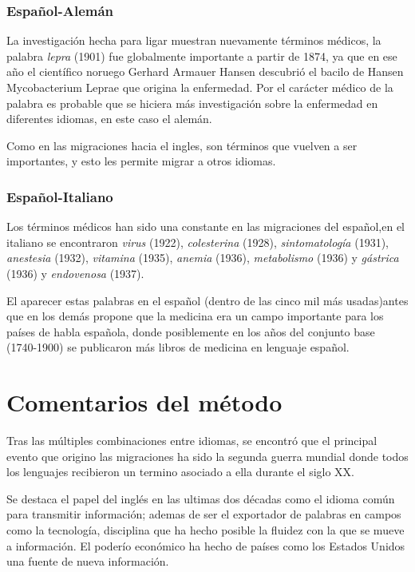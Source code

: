 \subsubsection*{Español-Alemán}


La investigación hecha para ligar muestran nuevamente términos médicos, la palabra \textit{lepra} (1901) fue globalmente importante a partir de 1874,  ya que en ese año el científico noruego Gerhard Armauer Hansen descubrió el bacilo de Hansen Mycobacterium Leprae \cite{lepra} que origina la enfermedad. Por el carácter médico de la palabra es probable que se hiciera más investigación sobre la enfermedad en diferentes idiomas, en este caso el alemán.

Como en las migraciones hacia el ingles, son términos que vuelven a ser importantes,  y esto les permite migrar a otros idiomas. 


\subsubsection*{Español-Italiano}

Los términos médicos han sido una constante en las migraciones del español,en el italiano se encontraron \textit{virus} (1922), \textit{colesterina} (1928),  \textit{sintomatología} (1931), \textit{anestesia} (1932), \textit{vitamina} (1935), \textit{anemia} (1936), \textit{metabolismo} (1936) y \textit{gástrica} (1936)  y \textit{endovenosa} (1937).  

El aparecer estas palabras en el español (dentro de las cinco mil más usadas)antes que en los demás propone que la medicina era un campo importante para los países de habla española, donde posiblemente en los años del conjunto base (1740-1900) se publicaron más libros de medicina en lenguaje español. 





\hfill\break
\hfill\break

\section{Comentarios del método}




Tras las múltiples combinaciones entre idiomas, se  encontró que el principal evento que origino las migraciones ha sido la segunda guerra mundial donde todos los lenguajes recibieron un termino asociado a ella durante el siglo XX.

Se destaca el papel del inglés en las ultimas dos décadas como el idioma común para transmitir información; ademas de ser el exportador de palabras en campos como la tecnología, disciplina que ha hecho posible la fluidez con la que se mueve a información. El poderío económico ha hecho de países como los Estados Unidos una fuente de nueva información.

